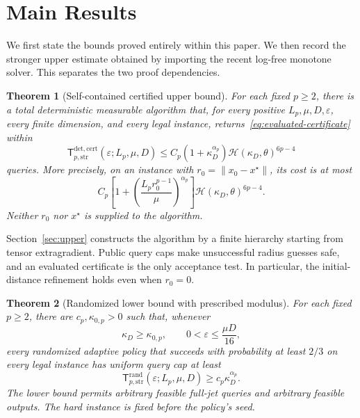 \documentclass[11pt]{article}
\numberwithin{equation}{section}
\newtheorem{theorem}{Theorem}[section]
\theoremstyle{definition}
\theoremstyle{remark}
\newcommand{\Trand}{\mathsf T_{p,\mathrm{str}}^{\mathrm{rand}}}
\newcommand{\Tcert}{\mathsf T_{p,\mathrm{str}}^{\mathrm{det,cert}}}
\newcommand{\ap}{\alpha_p}
\begin{document}
\section{Main Results}\label{sec:results}
We first state the bounds proved entirely within this paper. We then
record the stronger upper estimate obtained by importing the recent
log-free monotone solver. This separates the two proof dependencies.

\begin{theorem}[Self-contained certified upper bound]\label{thm:upper}
For each fixed $p\ge2$, there is a total deterministic measurable
algorithm that, for every positive $L_p,\mu,D,\varepsilon$, every finite
dimension, and every legal instance, returns~\eqref{eq:evaluated-certificate} within
\begin{equation}\label{eq:hierarchy-upper}
\Tcert(\varepsilon;L_p,\mu,D)
\le C_p(1+\kappa_D^{\ap})\mathcal H(\kappa_D,\theta)^{6p-4}
\end{equation}
queries. More precisely, on an instance with
$r_0=\|x_0-x^\star\|$, its cost is at most
\begin{equation}\label{eq:distance-sensitive-upper}
C_p\left[1+\left(\frac{L_pr_0^{p-1}}{\mu}\right)^{\ap}\right]
\mathcal H(\kappa_D,\theta)^{6p-4}.
\end{equation}
Neither $r_0$ nor $x^\star$ is supplied to the algorithm.
\end{theorem}

Section~\ref{sec:upper} constructs the algorithm by a finite hierarchy
starting from tensor extragradient. Public query caps make unsuccessful
radius guesses safe, and an evaluated certificate is the only acceptance
test. In particular, the initial-distance refinement holds even when
$r_0=0$.

\begin{theorem}[Randomized lower bound with prescribed modulus]
\label{thm:lower}
For each fixed $p\ge2$, there are $c_p,\kappa_{0,p}>0$ such that, whenever
\begin{equation}\label{eq:lower-regime}
\kappa_D\ge\kappa_{0,p},\qquad
0<\varepsilon\le\frac{\mu D}{16},
\end{equation}
every randomized adaptive policy that succeeds with probability at least
$2/3$ on every legal instance has uniform query cap at least
\begin{equation}\label{eq:randomized-lower}
\Trand(\varepsilon;L_p,\mu,D)
\ge c_p\kappa_D^{\ap}.
\end{equation}
The lower bound permits arbitrary feasible full-jet queries and arbitrary
feasible outputs. The hard instance is fixed before the policy's seed.
\end{theorem}
\end{document}
